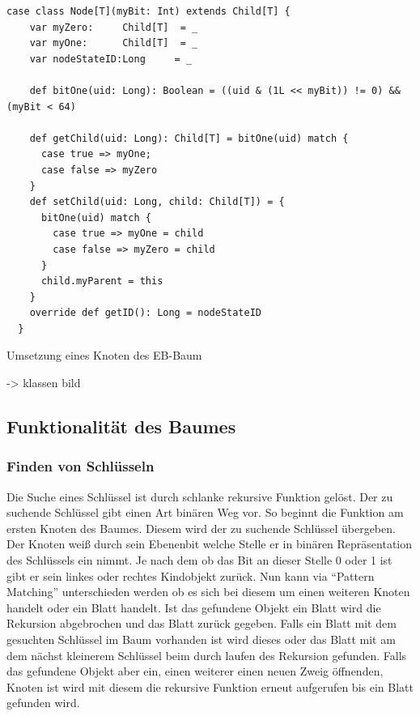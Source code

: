 \documentclass[a4paper,11pt,oneside,%
headsepline,												%
footsepline,												%
bibtotocnumbered									%
]{scrreprt}
\begin{document}
\begin{listing}[H]
	\begin{verbatim}
case class Node[T](myBit: Int) extends Child[T] {
    var myZero:     Child[T]  = _
    var myOne:      Child[T]  = _
    var nodeStateID:Long     = _

    def bitOne(uid: Long): Boolean = ((uid & (1L << myBit)) != 0) && (myBit < 64)

    def getChild(uid: Long): Child[T] = bitOne(uid) match {
      case true => myOne;
      case false => myZero
    }
    def setChild(uid: Long, child: Child[T]) = {
      bitOne(uid) match {
        case true => myOne = child
        case false => myZero = child
      }
      child.myParent = this
    }
    override def getID(): Long = nodeStateID
  }	
	\end{verbatim}
	\caption{Umsetzung eines Knoten des \ac{EB-Baum}}
	\label{lst:Knoten EB-Baum}
\end{listing}

-> klassen bild\\
\subsection{Funktionalität des Baumes}
\subsubsection{Finden von Schlüsseln}
Die Suche eines Schlüssel ist durch schlanke rekursive Funktion gelöst. Der zu suchende Schlüssel gibt einen Art binären Weg vor. So beginnt die Funktion am ersten Knoten des Baumes. Diesem wird der zu suchende Schlüssel übergeben. Der Knoten weiß durch sein Ebenenbit welche Stelle er in binären Repräsentation des Schlüssels ein nimmt. Je nach dem ob das Bit an dieser Stelle 0 oder 1 ist gibt er sein linkes oder rechtes Kindobjekt zurück. Nun kann via \enquote{Pattern Matching} unterschieden werden ob es sich bei diesem um einen weiteren Knoten handelt oder ein Blatt handelt. Ist das gefundene Objekt ein Blatt wird die Rekursion abgebrochen und das Blatt zurück gegeben. Falls ein Blatt mit dem gesuchten Schlüssel im Baum vorhanden ist wird dieses oder das Blatt mit am dem nächst kleinerem Schlüssel beim durch laufen des Rekursion gefunden. Falls das gefundene Objekt aber ein, einen weiterer einen neuen Zweig öffnenden, Knoten ist wird mit diesem die rekursive Funktion erneut aufgerufen bis ein Blatt gefunden wird.
\end{document}
